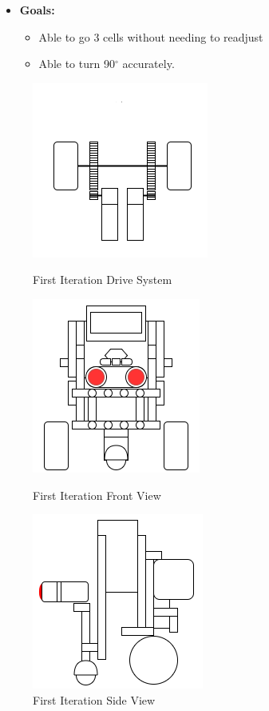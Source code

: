\documentclass[11pt]{article}
\begin{document}
\begin{itemize}
\item \textbf{Goals:}
	\begin{itemize}
	\item Able to go 3 cells without needing to readjust
	\item Able to turn 90$^{\circ}$ accurately.
	\end{itemize}
\end{itemize}
\begin{figure}[htp]
\centering
\captionsetup{justification=centering}
\includegraphics[scale=0.80]{images/Hardware_Mechanical/First_Iteration_Design_Driving_System.png}
\caption{First Iteration Drive System}\label{fig:Drive System}
\endminipage\hfill
{}
\includegraphics[scale=0.70]{images/Hardware_Mechanical/First_Iteration_Design_FrontView.png}
\caption{First Iteration Front View}\label{fig:Front View}
\endminipage\hfill
{}
\includegraphics[scale=0.70]{images/Hardware_Mechanical/First_Iteration_Design_SideView.png}
\caption{First Iteration Side View}\label{Side View}
\endminipage
\end{figure}
\end{document}
